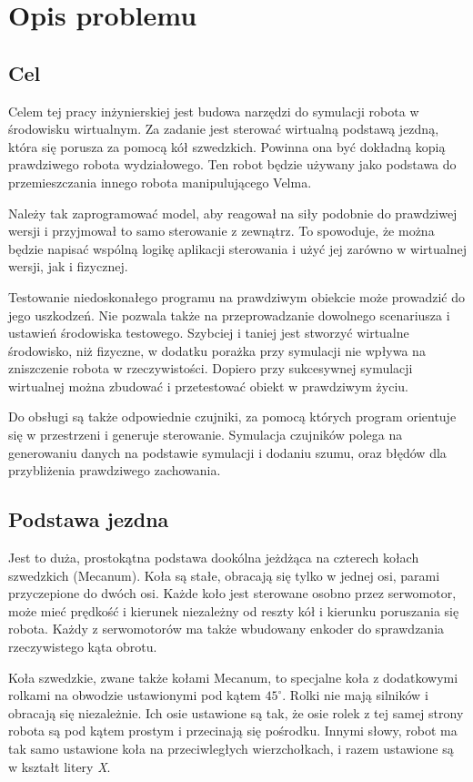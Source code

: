 \chapter{Opis problemu}
\section{Cel}
Celem tej pracy inżynierskiej jest budowa narzędzi do symulacji robota w środowisku wirtualnym.
Za zadanie jest sterować wirtualną podstawą jezdną, która się porusza za pomocą kół szwedzkich.
Powinna ona być dokładną kopią prawdziwego robota wydziałowego.
Ten robot będzie używany jako podstawa do przemieszczania innego robota manipulującego Velma.

Należy tak zaprogramować model, aby reagował na siły podobnie do prawdziwej wersji i przyjmował to samo sterowanie z zewnątrz.
To spowoduje, że można będzie napisać wspólną logikę aplikacji sterowania i użyć jej zarówno w wirtualnej wersji, jak i fizycznej.

Testowanie niedoskonałego programu na prawdziwym obiekcie może prowadzić do jego uszkodzeń. 
Nie pozwala także na przeprowadzanie dowolnego scenariusza i ustawień środowiska testowego.
Szybciej i taniej jest stworzyć wirtualne środowisko, niż fizyczne, w dodatku porażka przy symulacji nie wpływa na zniszczenie robota w rzeczywistości.
Dopiero przy sukcesywnej symulacji wirtualnej można zbudować i przetestować obiekt w prawdziwym życiu.

Do obsługi są także odpowiednie czujniki, za pomocą których program orientuje się w przestrzeni i generuje sterowanie.
Symulacja czujników polega na generowaniu danych na podstawie symulacji i dodaniu szumu, oraz błędów dla przybliżenia prawdziwego zachowania.

\section{Podstawa jezdna}
Jest to duża, prostokątna podstawa dookólna jeżdżąca na czterech kołach szwedzkich (Mecanum).
Koła są stałe, obracają się tylko w jednej osi, parami przyczepione do dwóch osi.
Każde koło jest sterowane osobno przez serwomotor, może mieć prędkość i kierunek niezależny od reszty kół i kierunku poruszania się robota.
Każdy z serwomotorów ma także wbudowany enkoder do sprawdzania rzeczywistego kąta obrotu.

Koła szwedzkie, zwane także kołami Mecanum, to specjalne koła z dodatkowymi rolkami na obwodzie ustawionymi pod kątem $45^\circ$.
Rolki nie mają silników i obracają się niezależnie.
Ich osie ustawione są tak, że osie rolek z tej samej strony robota są pod kątem prostym i przecinają się pośrodku.
Innymi słowy, robot ma tak samo ustawione koła na przeciwległych wierzchołkach, i razem ustawione są w kształt litery \emph{X}.

